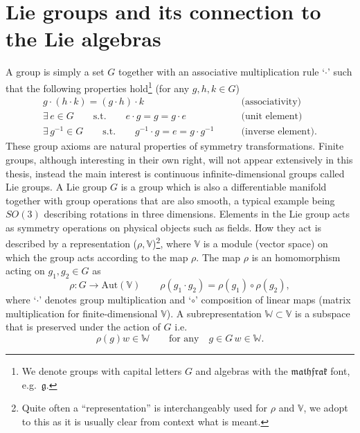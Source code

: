 \section{Lie groups and its connection to the Lie algebras}\label{sec:groups}
A group is simply a set $G$ together with an associative multiplication rule `$\cdot$' such that the following properties hold\footnote{We denote groups with capital letters $G$ and algebras with the $\mathfrak{mathfrak}$ font, e.g.\ $\mathfrak{g}$.} (for any $g,h,k\in G$)
\begin{align*}
    g\cdot \left(h\cdot k\right) = \left(g\cdot h\right)\cdot k \qquad &\text{(associativity)}\\
    \exists\, e \in G \qquad \text{s.t.} \qquad e\cdot g = g = g \cdot e\qquad &\text{(unit element)}\\
    \exists\, g^{-1}\in G\qquad \text{s.t.}\qquad g^{-1}\cdot g = e = g\cdot g^{-1} \qquad &\text{(inverse element)}.
\end{align*}
These group axioms are natural properties of symmetry transformations. Finite groups, although interesting in their own right, will not appear extensively in this thesis, instead the main interest is continuous infinite-dimensional groups called Lie groups. A Lie group $G$ is a group which is also a differentiable manifold together with group operations that are also smooth, a typical example being $SO(3)$ describing rotations in three dimensions. Elements in the Lie group acts as symmetry operations on physical objects such as fields. How they act is described by a representation ($\rho,\mathbb{V}$)\footnote{Quite often a ``representation'' is interchangeably used for $\rho$ and $\mathbb{V}$, we adopt to this as it is usually clear from context what is meant.}, where $\mathbb{V}$ is a module (vector space) on which the group acts according to the map $\rho$. The map $\rho$ is an homomorphism acting on $g_1,g_2\in G$ as
\begin{equation}
    \rho : G\to \text{Aut}(\mathbb{V}) \qquad \rho(g_1\cdot g_2) = \rho(g_1)\circ\rho(g_2),
\end{equation}
where `$\cdot$' denotes group multiplication and `$\circ$' composition of linear maps (matrix multiplication for finite-dimensional $\mathbb{V}$). A subrepresentation $\mathbb{W}\subset\mathbb{V}$ is a subspace that is preserved under the action of $G$ i.e.\
\begin{equation}
    \rho(g)w \in \mathbb{W} \qquad \text{for any} \quad g\in G\, w\in\mathbb{W}.
\end{equation}
